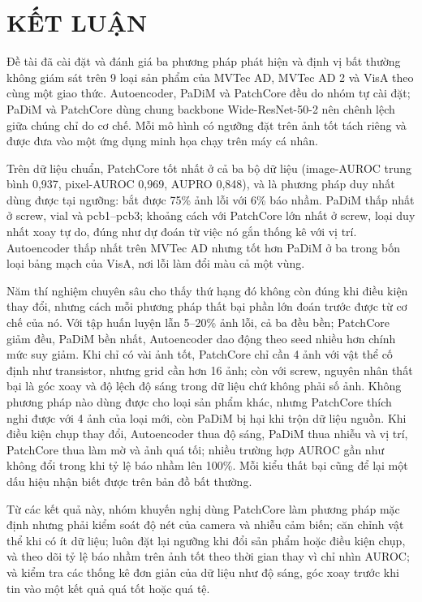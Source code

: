\chapter*{KẾT LUẬN}

Đề tài đã cài đặt và đánh giá ba phương pháp phát hiện và định vị bất thường không giám sát trên 9 loại sản phẩm của
MVTec AD, MVTec AD 2 và VisA theo cùng một giao thức. Autoencoder, PaDiM và PatchCore đều do nhóm tự cài đặt; PaDiM và
PatchCore dùng chung backbone Wide-ResNet-50-2 nên chênh lệch giữa chúng chỉ do cơ chế. Mỗi mô hình có ngưỡng đặt trên
ảnh tốt tách riêng và được đưa vào một ứng dụng minh họa chạy trên máy cá nhân.

Trên dữ liệu chuẩn, PatchCore tốt nhất ở cả ba bộ dữ liệu (image-AUROC trung bình 0,937, pixel-AUROC 0,969, AUPRO
0,848), và là phương pháp duy nhất dùng được tại ngưỡng: bắt được 75\% ảnh lỗi với 6\% báo nhầm. PaDiM thấp nhất
ở screw, vial và pcb1--pcb3; khoảng cách với PatchCore lớn nhất ở screw, loại duy nhất xoay tự do, đúng như dự đoán từ
việc nó gắn thống kê với vị trí. Autoencoder thấp nhất trên MVTec AD nhưng tốt hơn PaDiM ở ba trong bốn loại bảng
mạch của VisA, nơi lỗi làm đổi màu cả một vùng.

Năm thí nghiệm chuyên sâu cho thấy thứ hạng đó không còn đúng khi điều kiện thay đổi, nhưng cách mỗi phương pháp thất
bại phần lớn đoán trước được từ cơ chế của nó. Với tập huấn luyện lẫn 5--20\% ảnh lỗi, cả ba đều bền; PatchCore giảm
đều, PaDiM bền nhất, Autoencoder dao động theo seed nhiều hơn chính mức suy giảm. Khi chỉ có vài ảnh tốt, PatchCore
chỉ cần 4 ảnh với vật thể cố định như transistor, nhưng grid cần hơn 16 ảnh; còn với screw, nguyên nhân thất bại là góc xoay và độ lệch độ sáng trong dữ
liệu chứ không phải số ảnh. Không phương pháp nào dùng được cho loại sản phẩm khác, nhưng PatchCore thích nghi được
với 4 ảnh của loại mới, còn PaDiM bị hại khi trộn dữ liệu nguồn. Khi điều kiện chụp thay đổi, Autoencoder thua độ
sáng, PaDiM thua nhiễu và vị trí, PatchCore thua làm mờ và ảnh quá tối; nhiều trường hợp AUROC gần như không đổi trong
khi tỷ lệ báo nhầm lên 100\%. Mỗi kiểu thất bại cũng để lại một dấu hiệu nhận biết được trên bản đồ bất thường.

Từ các kết quả này, nhóm khuyến nghị dùng PatchCore làm phương pháp mặc định nhưng phải kiểm soát độ nét của camera và
nhiễu cảm biến; căn chỉnh vật thể khi có ít dữ liệu; luôn đặt lại ngưỡng khi đổi sản phẩm hoặc điều kiện chụp, và
theo dõi tỷ lệ báo nhầm trên ảnh tốt theo thời gian thay vì chỉ nhìn AUROC; và kiểm tra các thống kê đơn giản của dữ
liệu như độ sáng, góc xoay trước khi tin vào một kết quả quá tốt hoặc quá tệ.

